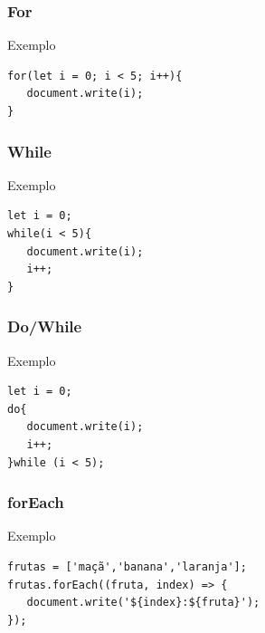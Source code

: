 \documentclass[aspectratio=169]{beamer} %
\begin{document}
\begin{frame}[fragile]
	\frametitle{For}
	
	\begin{exampleblock}{Exemplo}
		\begin{lstlisting}
for(let i = 0; i < 5; i++){
   document.write(i);
}
		\end{lstlisting}
	\end{exampleblock}
\end{frame}

\begin{frame}[fragile]
	\frametitle{While}
	
	\begin{exampleblock}{Exemplo}
		\begin{lstlisting}
let i = 0;
while(i < 5){
   document.write(i);
   i++;
}
		\end{lstlisting}
	\end{exampleblock}
\end{frame}

\begin{frame}[fragile]
	\frametitle{Do/While}
	
	\begin{exampleblock}{Exemplo}
		\begin{lstlisting}
let i = 0;
do{
   document.write(i);
   i++;
}while (i < 5);
		\end{lstlisting}
	\end{exampleblock}
\end{frame}

\begin{frame}[fragile]
	\frametitle{forEach}
	
	\begin{exampleblock}{Exemplo}
		\begin{lstlisting}
frutas = ['maçã','banana','laranja'];
frutas.forEach((fruta, index) => {
   document.write('${index}:${fruta}');
});
		\end{lstlisting}
	\end{exampleblock}
\end{frame}
\end{document}
